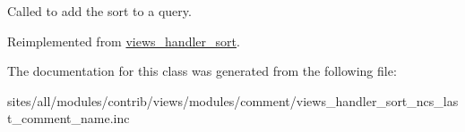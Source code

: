 Called to add the sort to a query. 

Reimplemented from \hyperlink{classviews__handler__sort_94fa33c5d037e41a927583fce2df3d18}{views\_\-handler\_\-sort}.

The documentation for this class was generated from the following file:\begin{CompactItemize}
\item 
sites/all/modules/contrib/views/modules/comment/views\_\-handler\_\-sort\_\-ncs\_\-last\_\-comment\_\-name.inc\end{CompactItemize}
